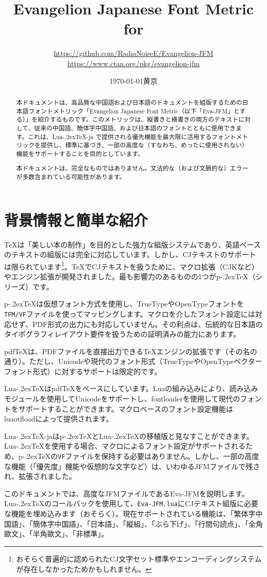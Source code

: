 \documentclass[twoside]{ltjsarticle}
\title{\sffamily\bfseries Evangelion Japanese Font Metric for \LuaTeX}
\author{\large \url{https://github.com/RadioNoiseE/Evangelion-JFM}\\\url{https://www.ctan.org/pkg/evangelion-jfm}}
\date{\西暦\today\quad{}黄京}
\def\段{\par}
\def\LuaTeX{Lua\kern-.2ex\TeX}
\def\pTeX{p\kern-.2ex\TeX}
\def\pdfTeX{pdf\TeX}
\begin{document}
\lstset{doubleletterspace = true}
\maketitle

\begin{abstract}
    本ドキュメントは、高品質な中国語および日本語のドキュメントを組版するための日本語フォントメトリック「Evangelion Japanese Font Metric（以下「\textsf{Eva-JFM}」とする）」を紹介するものです。このメトリックは、縦書きと横書きの両方のテキストに対して、従来の中国語、簡体字中国語、および日本語のフォントとともに使用できます。これは、\LuaTeX-ja で提供される優先機能を最大限に活用するフォントメトリックを提供し、標準\cite{jlreq}に基づき、一部の高度な（すなわち、めったに使用されない）機能をサポートすることを目的としています。\段
    本ドキュメントは、完全なものではありません。文法的な（および文脈的な）エラーが多数含まれている可能性があります。
\end{abstract}

\tableofcontents

\section{背景情報と簡単な紹介}
{\TeX}は「美しい本の制作」を目的とした強力な組版システムであり、英語ベースのテキストの組版には完全に対応しています。しかし、CJテキストのサポートは限られています\footnote{おそらく普遍的に認められたCJ文字セット標準やエンコーディングシステムが存在しなかったためかもしれません。}。{\TeX}でCJテキストを扱うために、マクロ拡張（\textsf{CJK}など）やエンジン拡張が開発されました。最も影響力のあるものの1つが{\pTeX}（シリーズ）です。\段
{\pTeX}は仮想フォント方式を使用し、TrueTypeやOpenTypeフォントを\texttt{TFM/VF}ファイルを使ってマッピングします。マクロを介したフォント設定には対応せず、PDF形式の出力にも対応していません。その利点は、伝統的な日本語のタイポグラフィレイアウト要件を扱うための証明済みの能力にあります。\段
{\pdfTeX}は、PDFファイルを直接出力できる{\TeX}エンジンの拡張です（その名の通り）。ただし、Unicodeや現代のフォント形式（TrueTypeやOpenTypeベクターフォント形式）に対するサポートは限定的です。\段
{\LuaTeX}は{\pdfTeX}をベースにしています。Luaの組み込みにより、読み込みモジュールを使用してUnicodeをサポートし、\textsf{fontloader}を使用して現代のフォントをサポートすることができます。マクロベースのフォント設定機能は\textsf{luaotfload}によって提供されます。\段
\LuaTeX-jaは{\pTeX}と{\LuaTeX}の移植版と見なすことができます。{\LuaTeX}を使用する場合、マクロによるフォント設定がサポートされるため、{\pTeX}の\texttt{VF}ファイルを保持する必要はありません。しかし、一部の高度な機能（「優先度」機能や仮想的な文字など）は、いわゆるJFMファイルで残され、拡張されました。\段
このドキュメントでは、高度なJFMファイルである\textsf{Eva-JFM}を説明します。{\LuaTeX}のコールバックを使用して、\texttt{Eva-JFM.lua}にCJテキスト組版に必要な機能を埋め込みます（おそらく）。現在サポートされている機能は、「繁体字中国語」、「簡体字中国語」、「日本語」、「縦組」、「ぶら下げ」、「行間句読点」、「全角歐文」、「半角歐文」、「非標準」。\段
\end{document}
